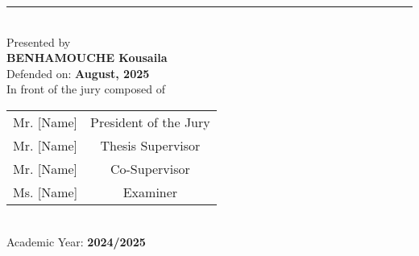 \begin{center}
\rule{12cm}{0.5pt} \\[1.5cm]

{\large Presented by} \\[0.3cm]
{\Large \textbf{BENHAMOUCHE Kousaila}} \\[1cm]

{\large Defended on: \textbf{August, 2025}} \\[0.3cm]
{\large In front of the jury composed of} \\[1cm]

\begin{tabular}{lc}
Mr. [Name] & President of the Jury \\
Mr. [Name] & Thesis Supervisor \\
Mr. [Name] & Co-Supervisor \\
Ms. [Name] & Examiner \\
\end{tabular} \\[1.5cm]

{\large Academic Year: \textbf{2024/2025}}

\end{center}

\newpage
